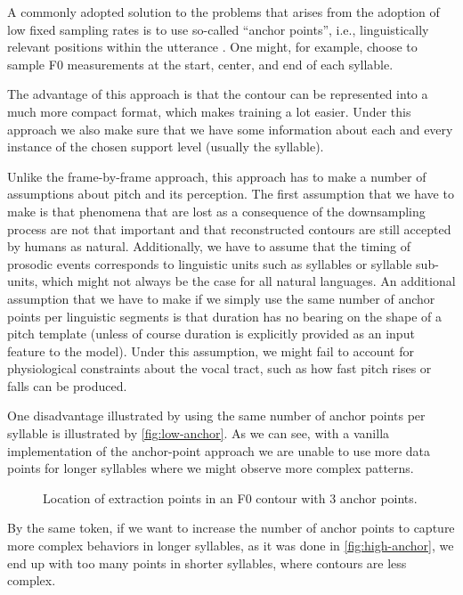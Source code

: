 A commonly adopted solution to the problems that arises from the adoption of low fixed sampling rates is to use so-called ``anchor points'', i.e., linguistically relevant positions within the utterance \citep[e.g.,][]{Santen1997Modeling}.
One might, for example, choose to sample \ac{F0} measurements at the start, center, and end of each syllable.

The advantage of this approach is that the contour can be represented into a much more compact format, which makes training a lot easier.
Under this approach we also make sure that we have some information about each and every instance of the chosen support level (usually  the syllable).

Unlike the frame-by-frame approach, this approach has to make a number of assumptions about pitch and its perception.
The first assumption that we have to make is that phenomena that are lost as a consequence of the downsampling process are not that important and that reconstructed contours are still accepted by humans as natural.
Additionally, we have to assume that the timing of prosodic events corresponds to linguistic units such as syllables or syllable sub-units, which might not always be the case for all natural languages.
An additional assumption that we have to make if we simply use the same number of anchor points per linguistic segments is that duration has no bearing on the shape of a pitch template (unless of course duration is explicitly provided as an input feature to the model).
Under this assumption, we might fail to account for physiological constraints about the vocal tract, such as how fast pitch rises or falls can be produced.

One disadvantage illustrated by using the same number of anchor points per syllable is illustrated by \autoref{fig:low-anchor}.
As we can see, with a vanilla implementation of the anchor-point approach we are unable to use more data points for longer syllables where we might observe more complex patterns.


\begin{figure}[h]
\centering
\resizebox{\textwidth}{!}{}
\caption[3 anchor-point sampling]{Location of extraction points in an \ac{F0} contour with 3 anchor points.}
\label{fig:low-anchor}
\end{figure}


By the same token, if we want to increase the number of anchor points to capture more complex behaviors in longer syllables, as it was done in \autoref{fig:high-anchor}, we end up with too many points in shorter syllables, where contours are less complex.


